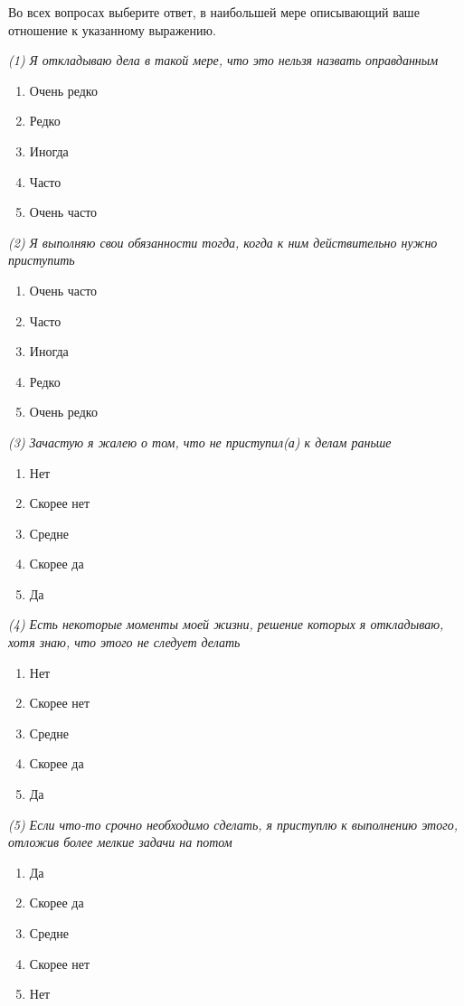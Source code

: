Во всех вопросах выберите ответ, в наибольшей мере описывающий ваше отношение к указанному выражению.

\textit{(1) Я откладываю дела в такой мере, что это нельзя назвать оправданным}

\begin{enumerate}
    \item Очень редко
    \item Редко
    \item Иногда
    \item Часто
    \item Очень часто
\end{enumerate}

\textit{(2) Я выполняю свои обязанности тогда, когда к ним действительно нужно приступить}
\begin{enumerate}
    \item Очень часто
    \item Часто
    \item Иногда
    \item Редко
    \item Очень редко
\end{enumerate}

\textit{(3) Зачастую я жалею о том, что не приступил(а) к делам раньше}
\begin{enumerate}
    \item Нет
    \item Скорее нет
    \item Средне
    \item Скорее да
    \item Да
\end{enumerate}

\textit{(4) Есть некоторые моменты моей жизни, решение которых я откладываю, хотя знаю, что этого не следует делать}
\begin{enumerate}
    \item Нет
    \item Скорее нет
    \item Средне
    \item Скорее да
    \item Да
\end{enumerate}

\textit{(5) Если что-то срочно необходимо сделать, я приступлю к выполнению этого, отложив более мелкие задачи на потом}
\begin{enumerate}
    \item Да
    \item Скорее да
    \item Средне
    \item Скорее нет
    \item Нет
\end{enumerate}

